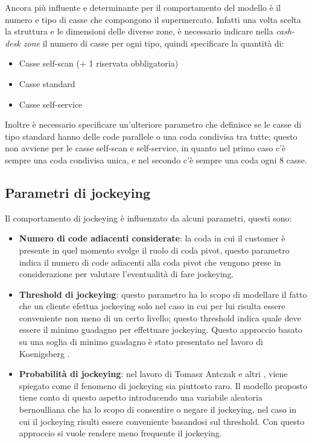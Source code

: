 Ancora più influente e determinante per il comportamento del modello è il numero e tipo di casse che compongono il supermercato. Infatti una volta scelta la struttura e le dimensioni delle diverse zone, è necessario indicare nella \textit{cash-desk zone} il numero di casse per ogni tipo, quindi specificare la quantità di:
\begin{itemize}
	\item Casse self-scan (+ 1 riservata obbligatoria)
	\item Casse standard
	\item Casse self-service
\end{itemize}

Inoltre è necessario specificare un'ulteriore parametro che definisce se le casse di tipo standard hanno delle code parallele o una coda condivisa tra tutte; questo non avviene per le casse self-scan e self-service, in quanto nel primo caso c'è sempre una coda condivisa unica, e nel secondo c'è sempre una coda ogni 8 casse.

\subsection{Parametri di jockeying}
Il comportamento di jockeying è influenzato da alcuni parametri, questi sono:
\begin{itemize}
	\item \textbf{Numero di code adiacenti considerate}: la coda in cui il customer è presente in quel momento svolge il ruolo di coda pivot, questo parametro indica il numero di code adiacenti alla coda pivot che vengono prese in considerazione per valutare l'eventualità di fare jockeying.
	\item \textbf{Threshold di jockeying}: questo parametro ha lo scopo di modellare il fatto che un cliente efettua jockeying solo nel caso in cui per lui risulta essere conveniente non meno di un certo livello; questo threshold indica quale deve essere il minimo guadagno per effettuare jockeying. Questo approccio basato su una soglia di minimo guadagno è stato presentato nel lavoro di Koenigsberg \cite{koenigsberg1966jockeying}.
	
	\item \textbf{Probabilità di jockeying}: nel lavoro di Tomasz Antczak e altri \cite{article1}, viene spiegato come il fenomeno di jockeying sia piuttosto raro. Il modello proposto tiene conto di questo aspetto introducendo una variabile aleatoria bernoulliana che ha lo scopo di consentire o negare il jockeying, nel caso in cui il jockeying risulti essere conveniente basandosi sul threshold. Con questo approccio si vuole rendere meno frequente il jockeying.
\end{itemize}

